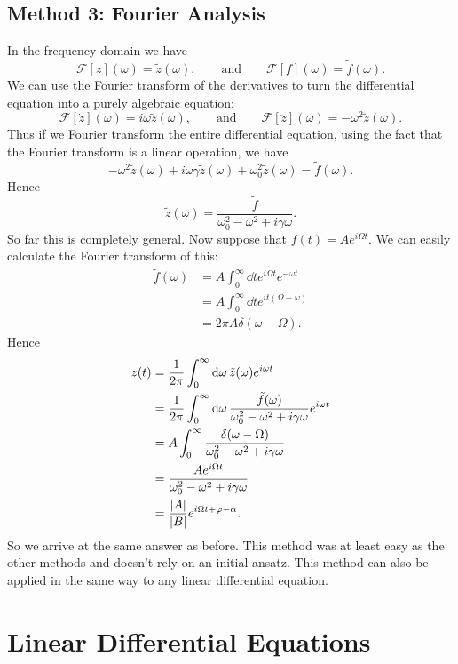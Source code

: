 \documentclass[a4paper]{article}
\newcommand{\FT}{\mathcal{F}}
\begin{document}
    \subsection{Method 3: Fourier Analysis}
    In the frequency domain we have
    \[\FT[z](\omega) = \tilde{z}(\omega), \qquad\text{and}\qquad \FT[f](\omega) = \tilde{f}(\omega).\]
    We can use the Fourier transform of the derivatives to turn the differential equation into a purely algebraic equation:
    \[\FT[\dot{z}](\omega) = i\omega\tilde{z}(\omega), \qquad\text{and}\qquad \FT[\ddot{z}](\omega) = -\omega^2\tilde{z}(\omega).\]
    Thus if we Fourier transform the entire differential equation, using the fact that the Fourier transform is a linear operation, we have
    \[-\omega^2\tilde{z}(\omega) + i\omega\gamma\tilde{z}(\omega) + \omega_0^2\tilde{z}(\omega) = \tilde{f}(\omega).\]
    Hence
    \[\tilde{z}(\omega) = \frac{\tilde{f}}{\omega_0^2 - \omega^2 + i\gamma\omega}.\]
    So far this is completely general.
    Now suppose that \(f(t) = Ae^{i\Omega t}\).
    We can easily calculate the Fourier transform of this:
    \begin{align*}
        \tilde{f}(\omega) &= A \int_{0}^{\infty} \dd{t} e^{i\Omega t}e^{-\omega t}\\
        &= A \int_{0}^{\infty} \dd{t} e^{it(\Omega - \omega)}\\
        &= 2\pi A\delta(\omega - \Omega).
    \end{align*}
    Hence
    \begin{align*}
        z(t) &= \frac{1}{2\pi} \int_{0}^{\infty} \dd{\omega} \tilde{z}(\omega)e^{i\omega t}\\
        &= \frac{1}{2\pi} \int_{0}^{\infty} \dd{\omega} \frac{\tilde{f}(\omega)}{\omega_0^2 - \omega^2 + i\gamma\omega}e^{i\omega t}\\
        &= A\int_{0}^{\infty} \frac{\delta(\omega - \Omega)}{\omega_0^2 - \omega^2 + i\gamma\omega}\\
        &= \frac{Ae^{i\Omega t}}{\omega_0^2 - \omega^2 + i\gamma\omega}\\
        &= \frac{\abs{A}}{\abs{B}}e^{i\Omega t + \varphi - \alpha}.
    \end{align*}
    So we arrive at the same answer as before.
    This method was at least easy as the other methods and doesn't rely on an initial ansatz.
    This method can also be applied in the same way to any linear differential equation.
    
    \section{Linear Differential Equations}
\end{document}
